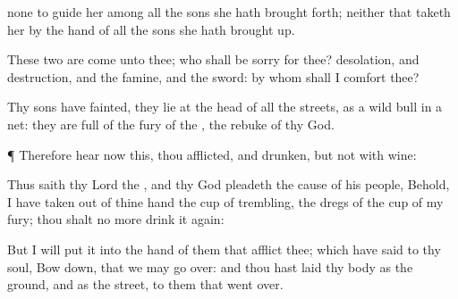 { none to
guide her among all the
sons
{} she hath brought
forth; neither
{} that
taketh her by the
hand of all the
sons
{} she hath brought
up.

These
two
{} are
come unto thee; who shall be
sorry for thee?
desolation, and
destruction, and the
famine, and the
sword: by whom shall I
comfort thee?

Thy
sons have
fainted, they
lie at the
head of all the
streets, as a wild
bull in a
net: they are
full of the
fury of the
{}, the
rebuke of thy
God.


\par }{\PP {}¶ Therefore
hear now this, thou
afflicted, and
drunken, but not with
wine:

Thus
saith thy
Lord the
{}, and thy
God
{}
pleadeth the cause of his
people, Behold, I have taken
out of thine
hand the
cup of
trembling,
{} the
dregs of the
cup of my
fury; thou shalt no
more drink it
again:

But I will
put it into the
hand of them that
afflict thee; which have
said to thy
soul, Bow
down, that we may go
over: and thou hast
laid thy
body as the
ground, and as the
street, to them that went
over.




\par }

